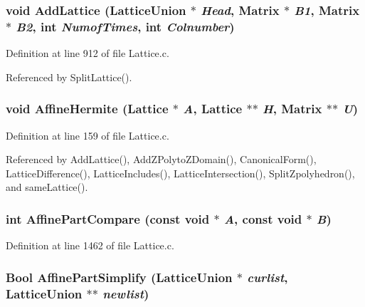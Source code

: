 \subsubsection{\setlength{\rightskip}{0pt plus 5cm}void Add\-Lattice (Lattice\-Union $\ast$ {\em Head}, Matrix $\ast$ {\em B1}, Matrix $\ast$ {\em B2}, int {\em Numof\-Times}, int {\em Colnumber})\hspace{0.3cm}{\tt  [static]}}\label{Lattice_8c_a18}




Definition at line 912 of file Lattice.c.

Referenced by Split\-Lattice().

\subsubsection{\setlength{\rightskip}{0pt plus 5cm}void Affine\-Hermite (Lattice $\ast$ {\em A}, Lattice $\ast$$\ast$ {\em H}, Matrix $\ast$$\ast$ {\em U})}\label{Lattice_8c_a8}




Definition at line 159 of file Lattice.c.

Referenced by Add\-Lattice(), Add\-ZPolyto\-ZDomain(), Canonical\-Form(), Lattice\-Difference(), Lattice\-Includes(), Lattice\-Intersection(), Split\-Zpolyhedron(), and same\-Lattice().

\subsubsection{\setlength{\rightskip}{0pt plus 5cm}int Affine\-Part\-Compare (const void $\ast$ {\em A}, const void $\ast$ {\em B})\hspace{0.3cm}{\tt  [static]}}\label{Lattice_8c_a31}




Definition at line 1462 of file Lattice.c.
\subsubsection{\setlength{\rightskip}{0pt plus 5cm}Bool Affine\-Part\-Simplify (Lattice\-Union $\ast$ {\em curlist}, Lattice\-Union $\ast$$\ast$ {\em newlist})\hspace{0.3cm}{\tt  [static]}}\label{Lattice_8c_a34}




